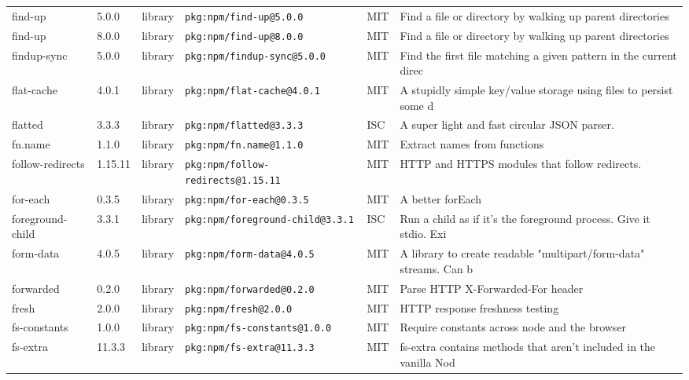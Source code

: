 \documentclass[11pt,a4paper]{article}
\begin{document}
\begin{longtable}{|p{4cm}|p{2cm}|p{1.6cm}|p{5cm}|p{1.5cm}|p{3.5cm}|}
\raggedright find-up & 5.0.0 & library & \small\texttt{pkg:npm/find-up@5.0.0} & MIT & \small Find a file or directory by walking up parent directories \\
\raggedright find-up & 8.0.0 & library & \small\texttt{pkg:npm/find-up@8.0.0} & MIT & \small Find a file or directory by walking up parent directories \\
\raggedright findup-sync & 5.0.0 & library & \small\texttt{pkg:npm/findup-sync@5.0.0} & MIT & \small Find the first file matching a given pattern in the current direc \\
\raggedright flat-cache & 4.0.1 & library & \small\texttt{pkg:npm/flat-cache@4.0.1} & MIT & \small A stupidly simple key/value storage using files to persist some d \\
\raggedright flatted & 3.3.3 & library & \small\texttt{pkg:npm/flatted@3.3.3} & ISC & \small A super light and fast circular JSON parser. \\
\raggedright fn.name & 1.1.0 & library & \small\texttt{pkg:npm/fn.name@1.1.0} & MIT & \small Extract names from functions \\
\raggedright follow-redirects & 1.15.11 & library & \small\texttt{pkg:npm/follow-redirects@1.15.11} & MIT & \small HTTP and HTTPS modules that follow redirects. \\
\raggedright for-each & 0.3.5 & library & \small\texttt{pkg:npm/for-each@0.3.5} & MIT & \small A better forEach \\
\raggedright foreground-child & 3.3.1 & library & \small\texttt{pkg:npm/foreground-child@3.3.1} & ISC & \small Run a child as if it's the foreground process. Give it stdio. Exi \\
\raggedright form-data & 4.0.5 & library & \small\texttt{pkg:npm/form-data@4.0.5} & MIT & \small A library to create readable "multipart/form-data" streams. Can b \\
\raggedright forwarded & 0.2.0 & library & \small\texttt{pkg:npm/forwarded@0.2.0} & MIT & \small Parse HTTP X-Forwarded-For header \\
\raggedright fresh & 2.0.0 & library & \small\texttt{pkg:npm/fresh@2.0.0} & MIT & \small HTTP response freshness testing \\
\raggedright fs-constants & 1.0.0 & library & \small\texttt{pkg:npm/fs-constants@1.0.0} & MIT & \small Require constants across node and the browser \\
\raggedright fs-extra & 11.3.3 & library & \small\texttt{pkg:npm/fs-extra@11.3.3} & MIT & \small fs-extra contains methods that aren't included in the vanilla Nod \\

\end{longtable}
\end{document}
